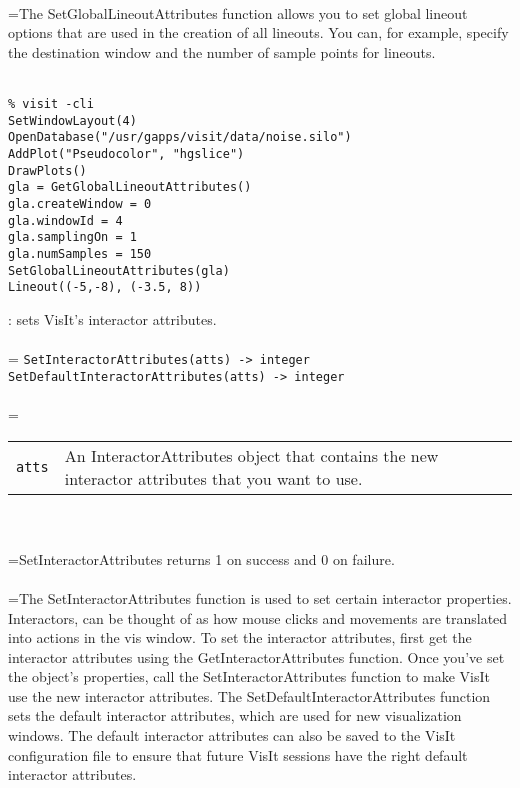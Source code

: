 \documentclass[10pt,a4paper]{report}
\begin{document}
 \\ 
\hangindent=\parindent The SetGlobalLineoutAttributes function allows you to set global lineout options that are used in the creation of all lineouts. You can, for example, specify the destination window and the number of sample points for lineouts. \\[-3mm] 

\\[-6mm]
\begin{verbatim}% visit -cli
SetWindowLayout(4)
OpenDatabase("/usr/gapps/visit/data/noise.silo")
AddPlot("Pseudocolor", "hgslice")
DrawPlots()
gla = GetGlobalLineoutAttributes()
gla.createWindow = 0
gla.windowId = 4
gla.samplingOn = 1
gla.numSamples = 150
SetGlobalLineoutAttributes(gla)
Lineout((-5,-8), (-3.5, 8))
\end{verbatim}
\newpage


{}
: sets VisIt's interactor attributes.\\[-3mm]

 \\ 
\hangindent=\parindent 
\verb!SetInteractorAttributes(atts) -> integer!\\ 
\verb!SetDefaultInteractorAttributes(atts) -> integer!\\ [-3mm]

 \\ 
\hangindent=\parindent 
\begin{tabular}{lp{9cm}}
\verb!atts! & An InteractorAttributes object that contains the new interactor attributes that you want to use. \\
\end{tabular} \\[-2mm]


 \\ 
\hangindent=\parindent SetInteractorAttributes returns 1 on success and 0 on failure. \\[-3mm] 

 \\ 
\hangindent=\parindent The SetInteractorAttributes function is used to set certain interactor properties. Interactors, can be thought of as how mouse clicks and movements are translated into actions in the vis window. To set the interactor attributes, first get the interactor attributes using the GetInteractorAttributes function. Once you've set the object's properties, call the SetInteractorAttributes function to make VisIt use the new interactor attributes. The SetDefaultInteractorAttributes function sets the default interactor attributes, which are used for new visualization windows. The default interactor attributes can also be saved to the VisIt configuration file to ensure that future VisIt sessions have the right default interactor attributes. \\[-3mm] 
\end{document}
